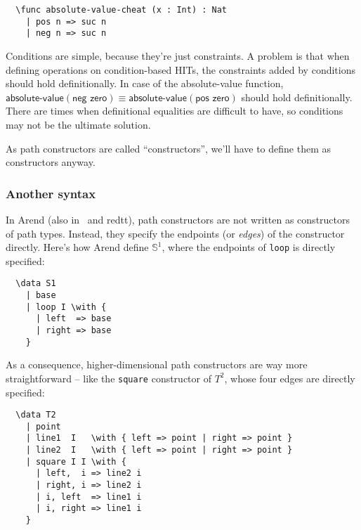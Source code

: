 \begin{verbatim}
  \func absolute-value-cheat (x : Int) : Nat
    | pos n => suc n
    | neg n => suc n
\end{verbatim}


Conditions are simple, because they're just constraints.
A problem is that when defining operations on condition-based HITs,
the constraints added by conditions should hold definitionally.
In case of the \textsf{absolute-value} function,
$\textsf{absolute-value}(\textsf{neg zero}) \equiv
\textsf{absolute-value}(\textsf{pos zero})$ should hold definitionally.
There are times when definitional equalities are difficult to have,
so conditions may not be the ultimate solution.

As path constructors are called ``constructors'',
we'll have to define them as constructors anyway.




\subsubsection{Another syntax}

In Arend (also in \RedPRL\ and redtt),
path constructors are not written as constructors of path types.
Instead, they specify the endpoints (or \textit{edges})
of the constructor directly.
Here's how Arend define $\mathbb{S}^1$,
where the endpoints of \texttt{loop} is directly specified:

\begin{verbatim}
  \data S1
    | base
    | loop I \with {
      | left  => base
      | right => base
    }
\end{verbatim}

As a consequence, higher-dimensional path constructors are way more
straightforward -- like the \texttt{square} constructor of $T^2$,
whose four edges are directly specified:

\begin{verbatim}
  \data T2
    | point
    | line1  I   \with { left => point | right => point }
    | line2  I   \with { left => point | right => point }
    | square I I \with {
      | left,  i => line2 i
      | right, i => line2 i
      | i, left  => line1 i
      | i, right => line1 i
    }
\end{verbatim}


